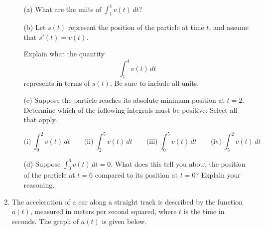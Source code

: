 \documentclass[11pt]{article}
\begin{document}
\begin{enumerate}
\begin{enumerate}
\item[(a)] What are the units of $\displaystyle \int_1^4 v(t)\,dt$?  

\vspace{4cm}

\item[(b)] Let $s(t)$ represent the position of the particle at time $t$, and assume that $s'(t) = v(t)$.  

Explain what the quantity
\[
\int_1^4 v(t)\,dt
\]
represents in terms of $s(t)$. Be sure to include all units.

\vspace{4cm}

\item[(c)] Suppose the particle reaches its absolute minimum position at $t = 2$.  
Determine which of the following integrals must be positive. Select all that apply.

\[
\text{(i)}\ \int_0^2 v(t)\,dt 
\qquad
\text{(ii)}\ \int_2^5 v(t)\,dt
\qquad
\text{(iii)}\ \int_0^5 v(t)\,dt
\qquad
\text{(iv)}\ \int_5^2 v(t)\,dt
\]

\vspace{2cm}

\item[(d)] Suppose $\displaystyle \int_0^6 v(t)\,dt = 0$.  
What does this tell you about the position of the particle at $t=6$ compared to its position at $t=0$?  
Explain your reasoning.

\end{enumerate}



\newpage


\item The acceleration of a car along a straight track is described by the function $a(t)$, measured in meters per second squared, where $t$ is the time in seconds. The graph of $a(t)$ is given below.

\begin{center}
\end{center}


\end{enumerate}
\end{document}

